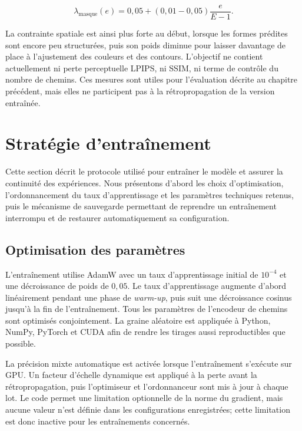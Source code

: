 \documentclass[12pt, a4paper, oneside]{report}
\begin{document}
\begin{equation}
    \lambda_{\mathrm{masque}}(e)
    = 0{,}05 + (0{,}01-0{,}05)\frac{e}{E-1}.
    \label{eq:poids_masque_approche}
\end{equation}

La contrainte spatiale est ainsi plus forte au début, lorsque les formes prédites sont encore peu structurées, puis son poids diminue pour laisser davantage de place à l'ajustement des couleurs et des contours. L'objectif ne contient actuellement ni perte perceptuelle LPIPS, ni SSIM, ni terme de contrôle du nombre de chemins. Ces mesures sont utiles pour l'évaluation décrite au chapitre précédent, mais elles ne participent pas à la rétropropagation de la version entraînée.

\section{Stratégie d'entraînement}
\label{sec:entrainement_approche}

Cette section décrit le protocole utilisé pour entraîner le modèle et assurer la continuité des expériences. Nous présentons d'abord les choix d'optimisation, l'ordonnancement du taux d'apprentissage et les paramètres techniques retenus, puis le mécanisme de sauvegarde permettant de reprendre un entraînement interrompu et de restaurer automatiquement sa configuration.

\subsection{Optimisation des paramètres}

L'entraînement utilise AdamW avec un taux d'apprentissage initial de $10^{-4}$ et une décroissance de poids de $0{,}05$. Le taux d'apprentissage augmente d'abord linéairement pendant une phase de \textit{warm-up}, puis suit une décroissance cosinus jusqu'à la fin de l'entraînement. Tous les paramètres de l'encodeur de chemins sont optimisés conjointement. La graine aléatoire est appliquée à Python, NumPy, PyTorch et CUDA afin de rendre les tirages aussi reproductibles que possible.

La précision mixte automatique est activée lorsque l'entraînement s'exécute sur GPU. Un facteur d'échelle dynamique est appliqué à la perte avant la rétropropagation, puis l'optimiseur et l'ordonnanceur sont mis à jour à chaque lot. Le code permet une limitation optionnelle de la norme du gradient, mais aucune valeur n'est définie dans les configurations enregistrées; cette limitation est donc inactive pour les entraînements concernés.
\end{document}

